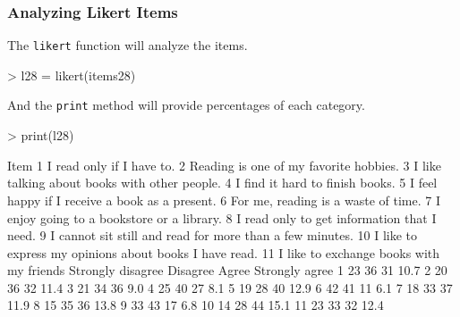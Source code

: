 \documentclass[10pt,slidestop,mathserif,c]{beamer}
\begin{document}
\begin{frame}[containsverbatim,fragile, shrink=20]
	\frametitle{Analyzing Likert Items}
    The \texttt{likert} function will analyze the items.
    
\begin{Schunk}
\begin{Sinput}
> l28 = likert(items28)
\end{Sinput}
\end{Schunk}
    
    And the \texttt{print} method will provide percentages of each category.
\begin{Schunk}
\begin{Sinput}
> print(l28)
\end{Sinput}
\begin{Soutput}
                                                       Item
1                                 I read only if I have to.
2                    Reading is one of my favorite hobbies.
3             I like talking about books with other people.
4                           I find it hard to finish books.
5            I feel happy if I receive a book as a present.
6                       For me, reading is a waste of time.
7                I enjoy going to a bookstore or a library.
8               I read only to get information that I need.
9  I cannot sit still and read for more than a few minutes.
10   I like to express my opinions about books I have read.
11                 I like to exchange books with my friends
   Strongly disagree Disagree Agree Strongly agree
1                 23       36    31           10.7
2                 20       36    32           11.4
3                 21       34    36            9.0
4                 25       40    27            8.1
5                 19       28    40           12.9
6                 42       41    11            6.1
7                 18       33    37           11.9
8                 15       35    36           13.8
9                 33       43    17            6.8
10                14       28    44           15.1
11                23       33    32           12.4
\end{Soutput}
\end{Schunk}
\end{frame}
\end{document}
